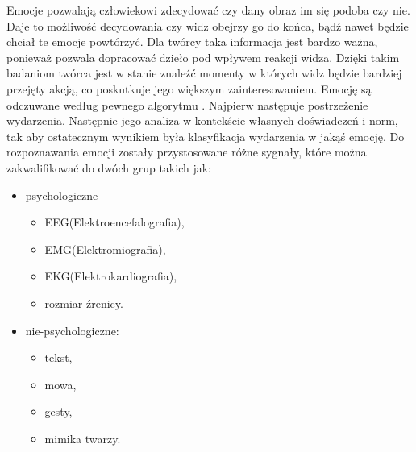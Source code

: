 \documentclass[10pt,journal,compsoc,twoside]{IEEEtran}
\begin{document}
\maketitle
\IEEEdisplaynontitleabstractindextext
\IEEEpeerreviewmaketitle
{}
Emocje pozwalają człowiekowi zdecydować czy dany obraz im się podoba czy nie. Daje to możliwość decydowania czy widz obejrzy go do końca, bądź nawet będzie chciał te emocje powtórzyć. Dla twórcy taka informacja jest bardzo ważna, ponieważ pozwala dopracować dzieło pod wpływem reakcji widza. Dzięki takim badaniom twórca jest w stanie znaleźć momenty w których widz będzie bardziej przejęty akcją, co poskutkuje jego większym zainteresowaniem.
\newline Emocję są odczuwane według pewnego algorytmu \cite{OrtonyCloreCollins1988}. Najpierw następuje postrzeżenie wydarzenia. Następnie jego analiza w kontekście własnych doświadczeń i norm, tak aby ostatecznym wynikiem była klasyfikacja wydarzenia w jakąś emocję. 
\newline Do rozpoznawania emocji zostały przystosowane różne sygnały, które można zakwalifikować do dwóch grup\cite{CalvoDMello2010} takich jak: \begin{itemize}
	\item psychologiczne
	\begin{itemize}
		\item EEG(Elektroencefalografia),
		\item EMG(Elektromiografia), 
		\item EKG(Elektrokardiografia), 
		\item rozmiar źrenicy.
	\end{itemize} 
	\item nie-psychologiczne: 
	\begin{itemize} 
		\item tekst, 
		\item mowa,
		\item  gesty, 
		\item mimika twarzy.
\end{itemize}
\end{itemize}

 
\end{document}
